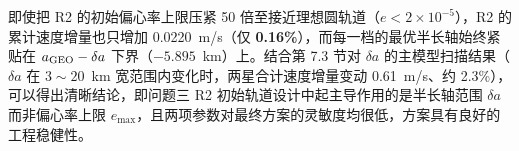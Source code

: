 即使把 R2 的初始偏心率上限压紧 50 倍至接近理想圆轨道（$e < 2\times 10^{-5}$），R2 的累计速度增量也只增加 0.0220~m/s（仅 \textbf{0.16\%}），而每一档的最优半长轴始终紧贴在 $a_{\mathrm{GEO}} - \delta a$ 下界（$-5.895$~km）上。结合第 7.3 节对 $\delta a$ 的主模型扫描结果（$\delta a$ 在 $3 \sim 20$~km 宽范围内变化时，两星合计速度增量变动 0.61~m/s、约 2.3\%），可以得出清晰结论，即问题三 R2 初始轨道设计中起主导作用的是半长轴范围 $\delta a$ 而非偏心率上限 $e_{\max}$，且两项参数对最终方案的灵敏度均很低，方案具有良好的工程稳健性。
